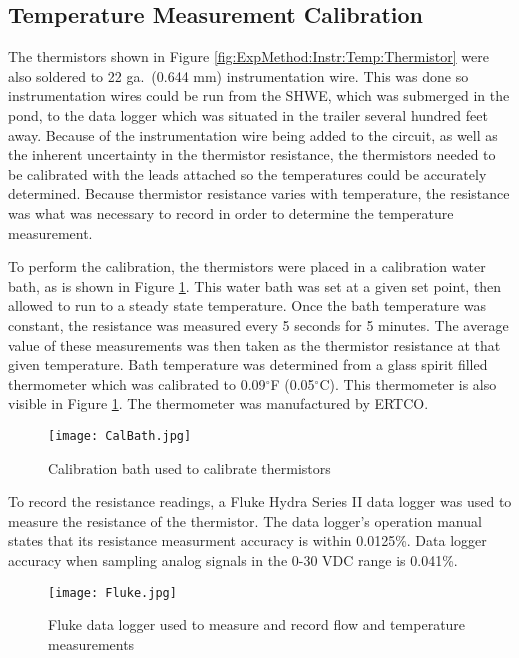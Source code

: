 	\subsection{Temperature Measurement Calibration}
	\label{subsec:ExpMethod:Instr:TempCal}

The thermistors shown in Figure \ref{fig:ExpMethod:Instr:Temp:Thermistor} were also soldered to 22 ga.\ (0.644 mm) instrumentation wire. This was done so instrumentation wires could be run from the SHWE, which was submerged in the pond, to the data logger which was situated in the trailer several hundred feet away. Because of the instrumentation wire being added to the circuit, as well as the inherent uncertainty in the thermistor resistance, the thermistors needed to be calibrated with the leads attached so the temperatures could be accurately determined. Because thermistor resistance varies with temperature, the resistance was what was necessary to record in order to determine the temperature measurement.

To perform the calibration, the thermistors were placed in a calibration water bath, as is shown in Figure \ref{fig:ExpMethod:Instr:TempCal:CalBath}. This water bath was set at a given set point, then allowed to run to a steady state temperature. Once the bath temperature was constant, the resistance was measured every 5 seconds for 5 minutes. The average value of these measurements was then taken as the thermistor resistance at that given temperature. Bath temperature was determined from a glass spirit filled thermometer which was calibrated to 0.09$^\circ$F (0.05$^\circ$C). This thermometer is also visible in Figure \ref{fig:ExpMethod:Instr:TempCal:CalBath}. The thermometer was manufactured by ERTCO.

\begin{figure}
	\centering
	\texttt{[image: CalBath.jpg]}
	\caption[Calibration bath]{Calibration bath used to calibrate thermistors}
	\label{fig:ExpMethod:Instr:TempCal:CalBath}
\end{figure}

To record the resistance readings, a Fluke Hydra Series II data logger was used to measure the resistance of the thermistor. The data logger's operation manual states that its resistance measurment accuracy is within 0.0125\%. Data logger accuracy when sampling analog signals in the 0-30 VDC range is 0.041\%.

\begin{figure}
	\centering
	\texttt{[image: Fluke.jpg]}
	\caption[Fluke data logger]{Fluke data logger used to measure and record flow and temperature measurements}
	\label{fig:ExpMethod:Instr:TempCal:Fluke}
\end{figure}

